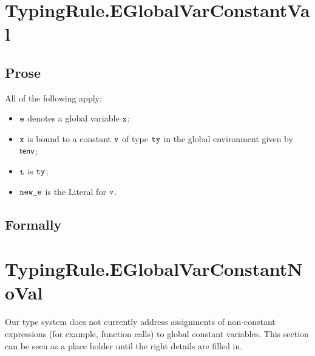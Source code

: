 \section{TypingRule.EGlobalVarConstantVal \label{sec:TypingRule.EGlobalVarConstant}}

\subsection{Prose}
All of the following apply:
\begin{itemize}
\item $\ve$ denotes a global variable $\vx$;
\item $\vx$ is bound to a constant $\vv$ of type $\tty$ in the global environment given by $\tenv$;
\item $\vt$ is $\tty$;
\item $\newe$ is the Literal for $\vv$.
\end{itemize}



  \subsection{Formally}
\begin{mathpar}
\end{mathpar}


\section{TypingRule.EGlobalVarConstantNoVal \label{sec:TypingRule.EGlobalVarConstantNoVal}}
Our type system does not currently address assignments of non-constant expressions (for example,
function calls) to global constant variables. This section can be seen as a place holder until
the right details are filled in.

